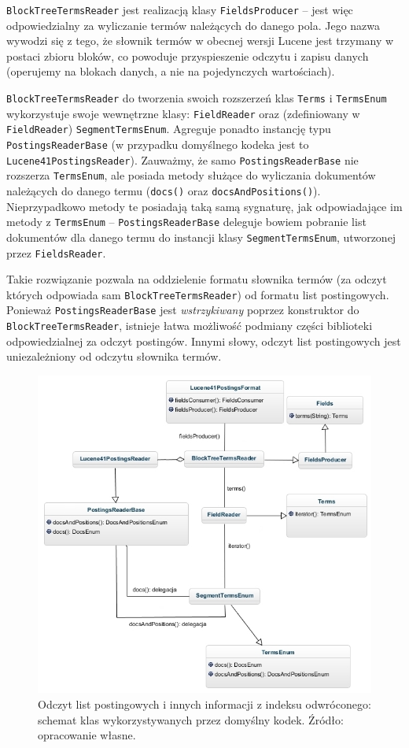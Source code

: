 \texttt{BlockTreeTermsReader} jest realizacją klasy \texttt{FieldsProducer} -- jest więc odpowiedzialny za wyliczanie termów należących do danego pola. Jego nazwa wywodzi się z tego, że słownik termów w obecnej wersji Lucene jest trzymany w postaci zbioru bloków, co powoduje przyspieszenie odczytu i zapisu danych (operujemy na blokach danych, a nie na pojedynczych wartościach). 

\texttt{BlockTreeTermsReader} do tworzenia swoich rozszerzeń klas \texttt{Terms} i \texttt{TermsEnum} wykorzystuje swoje wewnętrzne klasy: \texttt{FieldReader} oraz (zdefiniowany w \texttt{FieldReader}) \texttt{SegmentTermsEnum}. Agreguje ponadto instancję typu \texttt{PostingsReaderBase} (w przypadku domyślnego kodeka jest to \texttt{Lucene41PostingsReader}). Zauważmy, że samo \texttt{PostingsReaderBase} nie rozszerza \texttt{TermsEnum}, ale posiada metody służące do wyliczania dokumentów należących do danego termu (\texttt{docs()} oraz \texttt{docsAndPositions()}). Nieprzypadkowo metody te posiadają taką samą sygnaturę, jak odpowiadające im metody z \texttt{TermsEnum} -- \texttt{PostingsReaderBase} deleguje bowiem pobranie list dokumentów dla danego termu do instancji klasy \texttt{SegmentTermsEnum}, utworzonej przez \texttt{FieldsReader}.

Takie rozwiązanie pozwala na oddzielenie formatu słownika termów (za odczyt których odpowiada sam \texttt{BlockTreeTermsReader}) od formatu list postingowych. Ponieważ \texttt{PostingsReaderBase} jest \emph{wstrzykiwany} poprzez konstruktor do \texttt{BlockTreeTermsReader}, istnieje łatwa możliwość podmiany części biblioteki odpowiedzialnej za odczyt postingów. Innymi słowy, odczyt list postingowych jest uniezależniony od odczytu słownika termów.

\begin{figure}[here]
 \includegraphics[scale=0.62]{pictures/Lucene41PostingsFormatRead_1.jpg}
 \caption{Odczyt list postingowych i innych informacji z indeksu odwróconego: schemat klas wykorzystywanych przez domyślny kodek. Źródło: opracowanie własne. \label{fig:postingFormatRead}}
\end{figure}

